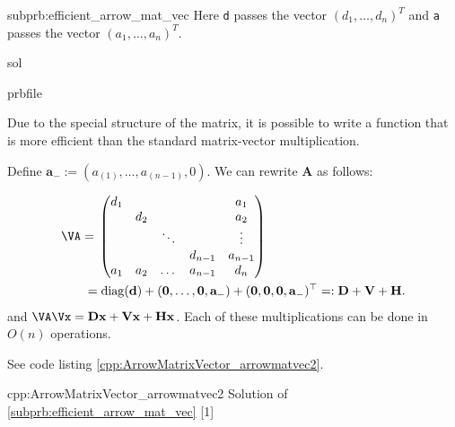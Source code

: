 \begin{samproblem}
\begin{subproblem}{subprb:efficient_arrow_mat_vec}
Here \texttt{d} passes the vector $(d_{1},\ldots,d_{n})^{T}$ and \texttt{a} passes the
vector $(a_{1},\ldots,a_{n})^{T}$.
 \begin{samwriteprbpart}{sol}
    \begin{writeverbatim}{prbfile}
   \begin{samsolution}
  Due to the special structure of the matrix, it is possible to
  write a function that is more efficient
  than the standard matrix-vector multiplication.

  Define $\mathbf{a}_- := (a_{(1)}, \dots, a_{(n-1)}, 0)$.
  We can rewrite $\mathbf{A}$ as follows:

    \begin{align}
    \VA= \; & \begin{pmatrix}
      d_1 &     &        &         & a_1     \\
          & d_2 &        &         & a_2     \\
          &     & \ddots &         & \vdots  \\
          &     &        & d_{n-1}  & a_{n-1} \\
      a_1 & a_2 & \dots  & a_{n-1}   & d_n     \\
    \end{pmatrix} \\
    = & \; \mathrm{diag}(\mathbf{d}) + (\mathbf{0},\dots,\mathbf{0}, \mathbf{a}_-) + (\mathbf{0},\mathbf{0},\mathbf{0},\mathbf{a}_-)^\top
    =: \mathbf{D} + \mathbf{V} + \mathbf{H}.
    \end{align}
    and $\VA \Vx = \mathbf{D} \mathbf{x} + \mathbf{V} \mathbf{x} + \mathbf{H} \mathbf{x}$. Each of these
    multiplications can be done in $O(n)$ operations.

    See code listing \ref{cpp:ArrowMatrixVector_arrowmatvec2}.
\vspace{0.5cm}

\begin{samcode}[C++11-code]
  {cpp:ArrowMatrixVector_arrowmatvec2}
  {Solution of \ref{subprb:efficient_arrow_mat_vec}}
[1]
\end{samcode}

\end{samsolution}
\end{writeverbatim}
\end{samwriteprbpart}
\end{subproblem}


\end{samproblem}
